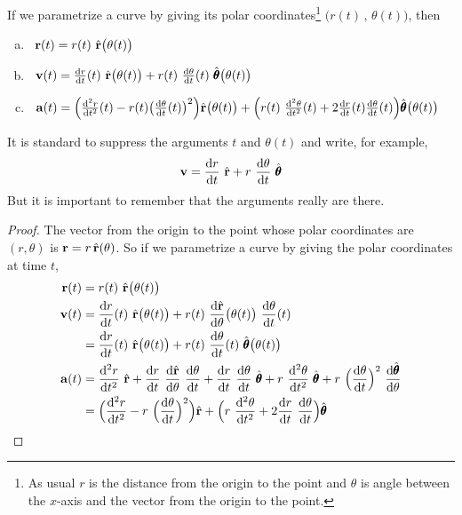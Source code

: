 \begin{lemma}\label{lem:polar}
If we parametrize a curve by giving its polar coordinates\footnote{As usual $r$ is the distance from the origin to the point and $\theta$ is angle between the $x$-axis and the vector from the origin to the point.} $\big(r(t)\,,\,\theta(t)\big)$, then
\begin{enumerate}[(a)]
\item
\  $\mathbf{r}(t) = r(t)\ \hat{\mathbf{r}}\big(\theta(t)\big)$
\item
\  $\vv(t) = \diff{r}{t}(t)\ \hat\vr\big(\theta(t)\big) 
             + r(t)\ \diff{\theta}{t}(t)\ \hat\vth\big(\theta(t)\big)$
\item
\  $\va(t) = 
\Big(\difftwo{r}{t}(t)-r(t)\big(\diff{\theta}{t}(t)\big)^2\Big) 
             \hat\vr\big(\theta(t)\big)
   +\Big(r(t)\ \difftwo{\theta}{t}(t) 
          + 2 \diff{r}{t}(t)\diff{\theta}{t}(t)\Big)
                  \hat\vth\big(\theta(t)\big)$
\end{enumerate}
\end{lemma}
\noindent It is standard to suppress the arguments $t$ and $\theta(t)$
and write, for example,
\begin{equation*}
\vv= \diff{r}{t}\ \hat\vr
             + r\ \diff{\theta}{t}\ \hat\vth
\end{equation*}
But it is important to remember that the arguments really are there.
\begin{proof}

The vector from the origin to the point whose 
polar coordinates are 
$(r,\theta)$ is $\mathbf{r} = r\,\hat{\mathbf{r}}(\theta)$. So if we parametrize a curve by 
giving the polar coordinates at time $t$,
\begin{align*}
\vr(t) &= r(t)\ \hat\vr\big(\theta(t)\big)
 \\
\vv(t) &= \diff{r}{t}(t)\ \hat\vr\big(\theta(t)\big) +
              r(t)\ \diff{\hat\vr}{\theta}\big(\theta(t)\big)\ 
              \diff{\theta}{t}(t) \notag\\
        &= \diff{r}{t}(t)\ \hat\vr\big(\theta(t)\big) 
             + r(t)\ \diff{\theta}{t}(t)\ \hat\vth\big(\theta(t)\big)
\\
\va(t) & = \difftwo{r}{t}\ \hat\vr 
                + \diff{r}{t}\ \diff{\hat\vr}{\theta}\ \diff{\theta}{t} 
             + \diff{r}{t}\ \diff{\theta}{t}\ \hat\vth
             + r\ \difftwo{\theta}{t}\ \hat\vth
             + r\ \Big(\diff{\theta}{t}\Big)^2\ \diff{\hat\vth}{\theta} 
\\
       &=\Big(\difftwo{r}{t}-r\ \Big(\diff{\theta}{t}\Big)^2\Big) \hat\vr
   +\Big(r\ \difftwo{\theta}{t} + 2 \diff{r}{t}\ \diff{\theta}{t}\Big)\hat\vth
\end{align*}
\end{proof}

